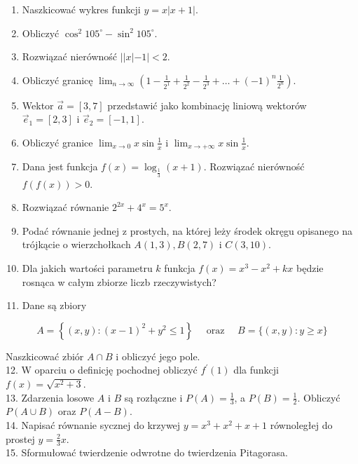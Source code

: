 \documentclass[10pt]{article}
\begin{document}
\begin{enumerate}
  \item Naszkicować wykres funkcji \(y=x|x+1|\).
  \item Obliczyć \(\cos ^{2} 105^{\circ}-\sin ^{2} 105^{\circ}\).
  \item Rozwiązać nierówność \(||x|-1|<2\).
  \item Obliczyć granicę \(\lim _{n \rightarrow \infty}\left(1-\frac{1}{2^{1}}+\frac{1}{2^{2}}-\frac{1}{2^{3}}+\ldots+(-1)^{n} \frac{1}{2^{n}}\right)\).
  \item Wektor \(\vec{a}=[3,7]\) przedstawić jako kombinację liniową wektorów \(\vec{e}_{1}=[2,3]\) i \(\vec{e}_{2}=[-1,1]\).
  \item Obliczyć granice \(\lim _{x \rightarrow 0} x \sin \frac{1}{x}\) i \(\lim _{x \rightarrow+\infty} x \sin \frac{1}{x}\).
  \item Dana jest funkcja \(f(x)=\log _{\frac{1}{3}}(x+1)\). Rozwiązać nierówność \(f(f(x))>0\).
  \item Rozwiązać równanie \(2^{2 x}+4^{x}=5^{x}\).
  \item Podać równanie jednej z prostych, na której leży środek okręgu opisanego na trójkącie o wierzchołkach \(A(1,3), B(2,7)\) i \(C(3,10)\).
  \item Dla jakich wartości parametru \(k\) funkcja \(f(x)=x^{3}-x^{2}+k x\) będzie rosnąca w całym zbiorze liczb rzeczywistych?
  \item Dane są zbiory
\end{enumerate}

\[
A=\left\{(x, y):(x-1)^{2}+y^{2} \leqslant 1\right\} \quad \text { oraz } \quad B=\{(x, y): y \geqslant x\}
\]

Naszkicować zbiór \(A \cap B\) i obliczyć jego pole.\\
12. W oparciu o definicję pochodnej obliczyć \(f^{\prime}(1)\) dla funkcji \(f(x)=\sqrt{x^{2}+3}\).\\
13. Zdarzenia losowe \(A\) i \(B\) są rozłączne i \(P(A)=\frac{1}{3}\), a \(P(B)=\frac{1}{2}\). Obliczyć \(P(A \cup B)\) oraz \(P(A-B)\).\\
14. Napisać równanie sycznej do krzywej \(y=x^{3}+x^{2}+x+1\) równoległej do prostej \(y=\frac{2}{3} x\).\\
15. Sformułować twierdzenie odwrotne do twierdzenia Pitagorasa.
\end{document}
